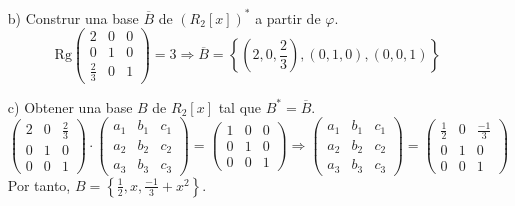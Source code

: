 \begin{ejercicio}
\begin{enumerate}
		\item[b)] Construr una base $\overline{B}$ de $(R_2[x])^{*}$ a partir de $\varphi$.
			\begin{equation*}
				\text{Rg}
				\begin{pmatrix}
					2           & 0 & 0 \\
					0           & 1 & 0 \\
					\frac{2}{3} & 0 & 1
				\end{pmatrix} = 3 \Rightarrow \overline{B} = \left\{ \left(2,0,\frac{2}{3}\right),(0,1,0),(0,0,1)\right\}
			\end{equation*}
		\item[c)] Obtener una base $B$ de $R_2[x]$ tal que $B^{*} = \overline{B}$.
			\begin{equation*}
				\begin{pmatrix}
					2 & 0 & \frac{2}{3} \\
					0 & 1 & 0           \\
					0 & 0 & 1
				\end{pmatrix} \cdot \begin{pmatrix}
					a_1 & b_1 & c_1 \\
					a_2 & b_2 & c_2 \\
					a_3 & b_3 & c_3
				\end{pmatrix} = \begin{pmatrix}
					1 & 0 & 0 \\
					0 & 1 & 0 \\
					0 & 0 & 1
				\end{pmatrix} \Rightarrow \begin{pmatrix}
					a_1 & b_1 & c_1 \\
					a_2 & b_2 & c_2 \\
					a_3 & b_3 & c_3
				\end{pmatrix} = \begin{pmatrix}
					\frac{1}{2} & 0 & \frac{-1}{3} \\
					0           & 1 & 0            \\
					0           & 0 & 1
				\end{pmatrix}
			\end{equation*}
			Por tanto, $B = \left\{\frac{1}{2},x,\frac{-1}{3}+x^2\right\}$.
	\end{enumerate}
\end{ejercicio}

